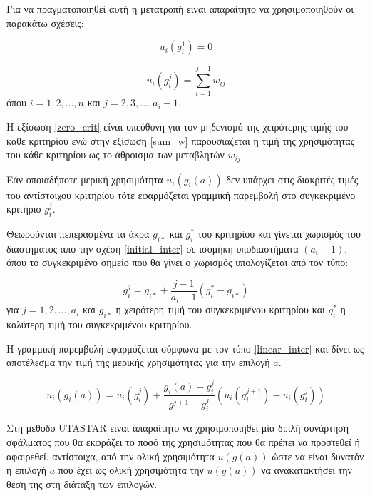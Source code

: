 \documentclass[11pt,a4paper,titlepage]{article}
\numberwithin{equation}{section}
\begin{document}
Για να πραγματοποιηθεί αυτή η μετατροπή είναι απαραίτητο να χρησιμοποιηθούν οι παρακάτω σχέσεις:

\begin{equation}\label{zero_crit}
	u_{i}(g^{1}_{i}) = 0
\end{equation}

\begin{equation}\label{sum_w}
	u_{i}(g^{j}_{i}) = \sum_{i=1}^{j-1} w_{ij}
\end{equation}
όπου $i = 1,2,...,n$ και $j = 2,3,...,a_{i}-1$.

\newpage

Η εξίσωση \ref{zero_crit} είναι υπεύθυνη για τον μηδενισμό της χειρότερης τιμής του κάθε κριτηρίου ενώ στην εξίσωση \ref{sum_w} παρουσιάζεται η τιμή της χρησιμότητας του κάθε κριτηρίου ως το άθροισμα των μεταβλητών $w_{ij}$.  

Εάν οποιαδήποτε μερική χρησιμότητα $u_{i}(g_{i}(a))$ δεν υπάρχει στις διακριτές τιμές του αντίστοιχου κριτηρίου τότε εφαρμόζεται γραμμική παρεμβολή στο συγκεκριμένο κριτήριο $g_{i}^{j}$. 

Θεωρούνται πεπερασμένα τα άκρα $g_{i*}$ και $g^{*}_{i}$ του κριτηρίου και γίνεται χωρισμός του διαστήματος από την σχέση \ref{initial_inter} σε ισομήκη υποδιαστήματα $(a_{i}-1)$, όπου το συγκεκριμένο σημείο που θα γίνει ο χωρισμός υπολογίζεται από τον τύπο:

\begin{equation}
	g_{i}^{j} = g_{i*} + \frac{j-1}{a_{i}-1}(g^{*}_{i}-g_{i*})
\end{equation}
για $j = 1,2,...,a_{i}$ και $g_{i*}$ η χειρότερη τιμή του συγκεκριμένου κριτηρίου και $g^{*}_{i}$ η καλύτερη τιμή του συγκεκριμένου κριτηρίου.

Η γραμμική παρεμβολή εφαρμόζεται σύμφωνα με τον τύπο \ref{linear_inter} και δίνει ως αποτέλεσμα την τιμή της μερικής χρησιμότητας για την επιλογή $a$.

\begin{equation}\label{linear_inter}
	u_{i}(g_{i}(a)) = u_{i}(g^{j}_{i}) + \frac{g_{i}(a)-g^{j}_{i}}{g^{j+1}-g^{j}_{i}}(u_{i}(g_{i}^{j+1})-u_{i}(g_{i}^{j}))
\end{equation}


Στη μέθοδο UTASTAR είναι απαραίτητο να χρησιμοποιηθεί μία διπλή συνάρτηση σφάλματος που θα εκφράζει το ποσό της χρησιμότητας που θα πρέπει να προστεθεί ή αφαιρεθεί, αντίστοιχα, από την ολική χρησιμότητα $u(g(a))$ ώστε να είναι δυνατόν η επιλογή $a$ που έχει ως ολική χρησιμότητα την $u(g(a))$ να ανακατακτήσει την θέση της στη διάταξη των επιλογών.
\end{document}
